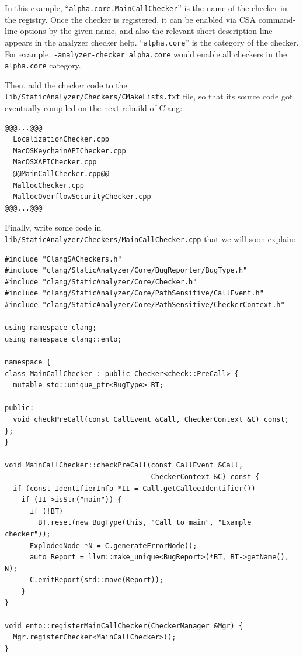 \documentclass[a4paper,12pt]{article}
\newenvironment{nobr}{\begin{minipage}{\textwidth}\setlength\parskip{1em}
}{\end{minipage}\ignorespacesafterend}
\begin{document}
In this example, ``\lstinline|alpha.core.MainCallChecker|'' is the name of the checker in the registry. Once the checker is registered, it can be enabled via CSA command-line options by the given name, and also the relevant short description line appears in the analyzer checker help. ``\lstinline|alpha.core|'' is the category of the checker. For example, \lstinline|-analyzer-checker alpha.core| would enable all checkers in the \lstinline|alpha.core| category.

\begin{nobr}
Then, add the checker code to the \lstinline|lib/StaticAnalyzer/Checkers/CMakeLists.txt| file, so that its source code got eventually compiled on the next rebuild of Clang:
\begin{lstlisting}[style=commandline,title=\lstinline|@CMakeLists.txt@|]
@@@...@@@
  LocalizationChecker.cpp
  MacOSKeychainAPIChecker.cpp
  MacOSXAPIChecker.cpp
  @@MainCallChecker.cpp@@
  MallocChecker.cpp
  MallocOverflowSecurityChecker.cpp
@@@...@@@
\end{lstlisting}
\end{nobr}

\begin{nobr}
Finally, write some code in \lstinline|lib/StaticAnalyzer/Checkers/MainCallChecker.cpp| that we will soon explain:
\begin{lstlisting}[style=cplusplus,title=\lstinline|MainCallChecker.cpp|]
#include "ClangSACheckers.h"
#include "clang/StaticAnalyzer/Core/BugReporter/BugType.h"
#include "clang/StaticAnalyzer/Core/Checker.h"
#include "clang/StaticAnalyzer/Core/PathSensitive/CallEvent.h"
#include "clang/StaticAnalyzer/Core/PathSensitive/CheckerContext.h"

using namespace clang;
using namespace clang::ento;

namespace {
class MainCallChecker : public Checker<check::PreCall> {
  mutable std::unique_ptr<BugType> BT;

public:
  void checkPreCall(const CallEvent &Call, CheckerContext &C) const;
};
}

void MainCallChecker::checkPreCall(const CallEvent &Call,
                                   CheckerContext &C) const {
  if (const IdentifierInfo *II = Call.getCalleeIdentifier())
    if (II->isStr("main")) {
      if (!BT)
        BT.reset(new BugType(this, "Call to main", "Example checker"));
      ExplodedNode *N = C.generateErrorNode();
      auto Report = llvm::make_unique<BugReport>(*BT, BT->getName(), N);
      C.emitReport(std::move(Report));
    }
}

void ento::registerMainCallChecker(CheckerManager &Mgr) {
  Mgr.registerChecker<MainCallChecker>();
}
\end{lstlisting}
\end{nobr}
\end{document}
